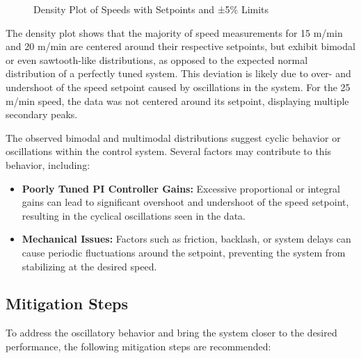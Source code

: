 \begin{figure}[H]
    \centering
    \caption{Density Plot of Speeds with Setpoints and ±5\% Limits}
    \label{fig:speed_density}
\end{figure}
The density plot shows that the majority of speed measurements for 15 m/min and 20 m/min are centered around their respective setpoints, but exhibit bimodal or even sawtooth-like distributions, as opposed to the expected normal distribution of a perfectly tuned system. This deviation is likely due to over- and undershoot of the speed setpoint caused by oscillations in the system. For the 25 m/min speed, the data was not centered around its setpoint, displaying multiple secondary peaks.

The observed bimodal and multimodal distributions suggest cyclic behavior or oscillations within the control system. Several factors may contribute to this behavior, including:

\begin{itemize}
    \item \textbf{Poorly Tuned PI Controller Gains:} Excessive proportional or integral gains can lead to significant overshoot and undershoot of the speed setpoint, resulting in the cyclical oscillations seen in the data.
    \item \textbf{Mechanical Issues:} Factors such as friction, backlash, or system delays can cause periodic fluctuations around the setpoint, preventing the system from stabilizing at the desired speed.
\end{itemize}

\subsection*{Mitigation Steps}

To address the oscillatory behavior and bring the system closer to the desired performance, the following mitigation steps are recommended:

